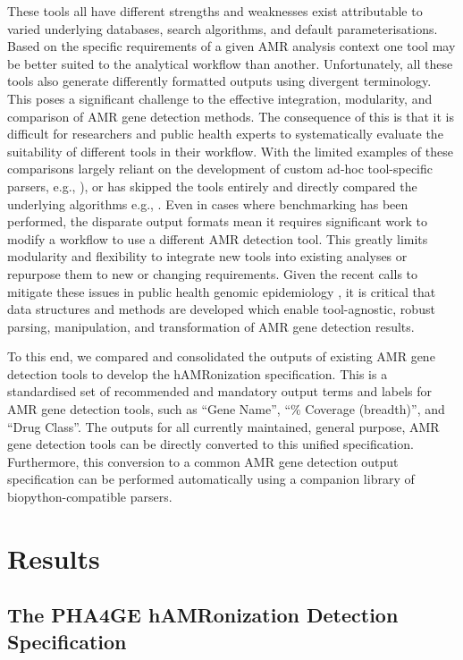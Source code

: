 These tools all have different strengths and weaknesses exist attributable to varied underlying databases, search algorithms, and default parameterisations. Based on the specific requirements of a given AMR analysis context one tool may be better suited to the analytical workflow than another.    
Unfortunately, all these tools also generate differently formatted outputs using divergent terminology. This poses a significant challenge to the effective integration, modularity, and comparison of AMR gene detection methods. The consequence of this is that it is difficult for researchers and public health experts to systematically evaluate the suitability of different tools in their workflow. With the limited examples of these comparisons largely reliant on the development of custom ad-hoc tool-specific parsers, e.g., \cite{feldgarden_validating_2019, hunt_ariba_2017}), or has skipped the tools entirely and directly compared the underlying algorithms e.g., \cite{mccall_comparative_2018}. Even in cases where benchmarking has been performed, the disparate output formats mean it requires significant work to modify a workflow to use a different AMR detection tool. This greatly limits modularity and flexibility to integrate new tools into existing analyses or repurpose them to new or changing requirements.  Given the recent calls to mitigate these issues in public health genomic epidemiology \cite{black_ten_2020}, it is critical that data structures and methods are developed which enable tool-agnostic, robust parsing, manipulation, and transformation of AMR gene detection results.

To this end, we compared and consolidated the outputs of existing AMR gene detection tools to develop the hAMRonization specification. This is a standardised set of recommended and mandatory output terms and labels for AMR gene detection tools, such as “Gene Name”, “\% Coverage (breadth)”, and “Drug Class”.  The outputs for all currently maintained, general purpose, AMR gene detection tools can be directly converted to this unified specification.  Furthermore, this conversion to a common AMR gene detection output specification can be performed automatically using a companion library of  biopython-compatible parsers.

\section{Results}

\subsection{The PHA4GE hAMRonization Detection Specification}

